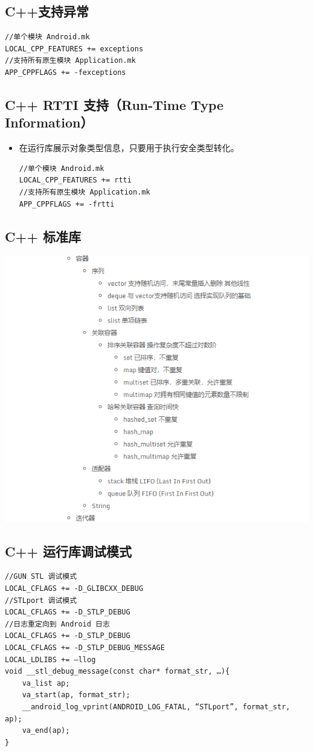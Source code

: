 \documentclass[9pt, b5paper]{article}
\begin{document}
\subsection{C++支持异常}
\label{sec-6-3}
\begin{verbatim}
//单个模块 Android.mk
LOCAL_CPP_FEATURES += exceptions
//支持所有原生模块 Application.mk
APP_CPPFLAGS += -fexceptions
\end{verbatim}
\subsection{C++ RTTI 支持（Run-Time Type Information）}
\label{sec-6-4}
\begin{itemize}
\item 在运行库展示对象类型信息，只要用于执行安全类型转化。
\begin{verbatim}
//单个模块 Android.mk
LOCAL_CPP_FEATURES += rtti
//支持所有原生模块 Application.mk
APP_CPPFLAGS += -frtti
\end{verbatim}
\end{itemize}
\subsection{C++ 标准库}
\label{sec-6-5}

\includegraphics[width=.9\linewidth]{./pic/c++stdlib.png}
\subsection{C++ 运行库调试模式}
\label{sec-6-6}
\begin{verbatim}
//GUN STL 调试模式
LOCAL_CFLAGS += -D_GLIBCXX_DEBUG
//STLport 调试模式
LOCAL_CFLAGS += -D_STLP_DEBUG
//日志重定向到 Android 日志 
LOCAL_CFLAGS += -D_STLP_DEBUG
LOCAL_CFLAGS += -D_STLP_DEBUG_MESSAGE
LOCAL_LDLIBS += —llog
void __stl_debug_message(const char* format_str, …){
    va_list ap;
    va_start(ap, format_str);
    __android_log_vprint(ANDROID_LOG_FATAL, “STLport”, format_str, ap);
    va_end(ap);
}
\end{verbatim}
\end{document}
